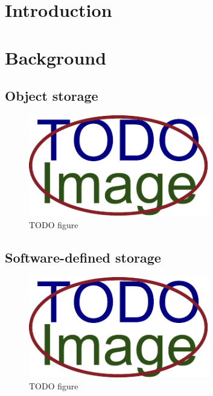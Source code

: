 
\chapter{Introduction}

\textcolor{gray}{\Blindtext}

\chapter{Background}

\section{Object storage}
    \textcolor{gray}{\Blindtext}
    \begin{figure}[hbt]
        \centering
        \includegraphics[width=0.7\textwidth]{obrazky-figures/placeholder.pdf}
        \caption{TODO figure}
    \end{figure}
\section{Software-defined storage}
    \textcolor{gray}{\Blindtext}
    \begin{figure}[hbt]
        \centering
        \includegraphics[width=0.7\textwidth]{obrazky-figures/placeholder.pdf}
        \caption{TODO figure}
    \end{figure}

